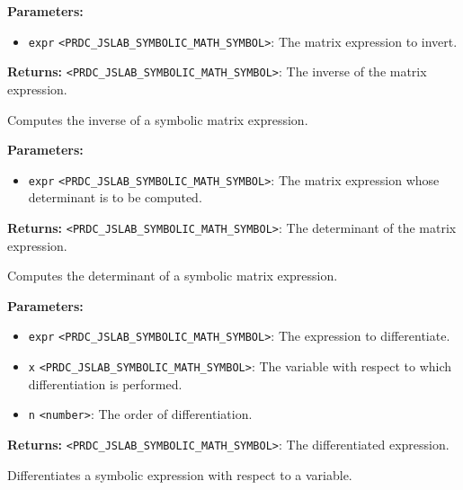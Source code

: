 \documentclass[12pt,a4paper]{article}
\begin{document}
\noindent \textbf{Parameters:}
\begin{itemize}
  \item \texttt{expr} \texttt{<PRDC\_JSLAB\_SYMBOLIC\_MATH\_SYMBOL>}: The matrix expression to invert.
\end{itemize}

\noindent \textbf{Returns:} \texttt{<PRDC\_JSLAB\_SYMBOLIC\_MATH\_SYMBOL>}: The inverse of the matrix expression.

\noindent Computes the inverse of a symbolic matrix expression.

\vspace{5mm}
\noindent {}


\noindent \textbf{Parameters:}
\begin{itemize}
  \item \texttt{expr} \texttt{<PRDC\_JSLAB\_SYMBOLIC\_MATH\_SYMBOL>}: The matrix expression whose determinant is to be computed.
\end{itemize}

\noindent \textbf{Returns:} \texttt{<PRDC\_JSLAB\_SYMBOLIC\_MATH\_SYMBOL>}: The determinant of the matrix expression.

\noindent Computes the determinant of a symbolic matrix expression.

\vspace{5mm}
\noindent {}


\noindent \textbf{Parameters:}
\begin{itemize}
  \item \texttt{expr} \texttt{<PRDC\_JSLAB\_SYMBOLIC\_MATH\_SYMBOL>}: The expression to differentiate.
  \item \texttt{x} \texttt{<PRDC\_JSLAB\_SYMBOLIC\_MATH\_SYMBOL>}: The variable with respect to which differentiation is performed.
  \item \texttt{n} \texttt{<number>}: The order of differentiation.
\end{itemize}

\noindent \textbf{Returns:} \texttt{<PRDC\_JSLAB\_SYMBOLIC\_MATH\_SYMBOL>}: The differentiated expression.

\noindent Differentiates a symbolic expression with respect to a variable.
\end{document}
